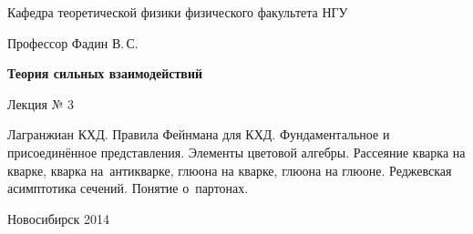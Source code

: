 \documentclass[12pt,pagesize,paper=landscape,paper=192mm:108mm]{scrbook}
\begin{document}
\begin{titlepage}
\begin{center}
    Кафедра теоретической физики физического факультета НГУ
    \medskip

    \Large
    Профессор Фадин В.\,С.

    \huge
    \textbf{Теория сильных взаимодействий}
    \smallskip

    \Large
    Лекция № 3
    \vfill

    \normalsize
    \begin{minipage}{0.68\linewidth}
      Лагранжиан КХД. Правила Фейнмана для КХД. Фундаментальное и
      присоединённое представления. Элементы цветовой
      алгебры. Рассеяние кварка на кварке, кварка на~антикварке,
      глюона на кварке, глюона на глюоне. Реджевская асимптотика
      сечений. Понятие о~партонах.
    \end{minipage}
    \vfill

    \normalsize \ccbysa\hspace{0.5em} Новосибирск 2014
  \end{center}
\end{titlepage}
\end{document}
